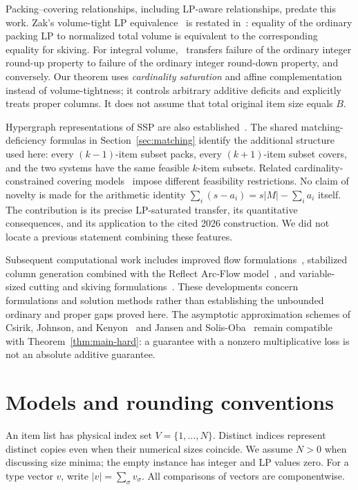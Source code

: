 \documentclass[11pt,a4paper]{article}
\theoremstyle{definition}
\theoremstyle{remark}
\begin{document}
Packing--covering relationships, including LP-aware relationships, predate this work. Zak's volume-tight LP equivalence~\cite[Theorem~2]{Zak03} is restated in~\cite[Lemma~8]{MS19}: equality of the ordinary packing LP to normalized total volume is equivalent to the corresponding equality for skiving. For integral volume,~\cite[Theorem~7]{MS19} transfers failure of the ordinary integer round-up property to failure of the ordinary integer round-down property, and conversely. Our theorem uses \emph{cardinality saturation} and affine complementation instead of volume-tightness; it controls arbitrary additive deficits and explicitly treats proper columns. It does not assume that total original item size equals $B$.

Hypergraph representations of SSP are also established~\cite{MS18c}. The shared matching-deficiency formulas in Section~\ref{sec:matching} identify the additional structure used here: every $(k-1)$-item subset packs, every $(k+1)$-item subset covers, and the two systems have the same feasible $k$-item subsets. Related cardinality-constrained covering models~\cite{EIL13} impose different feasibility restrictions. No claim of novelty is made for the arithmetic identity $\sum_i(s-a_i)=s|M|-\sum_i a_i$ itself. The contribution is its precise LP-saturated transfer, its quantitative consequences, and its application to the cited 2026 construction. We did not locate a previous statement combining these features.

Subsequent computational work includes improved flow formulations~\cite{MDISS20}, stabilized column generation combined with the Reflect Arc-Flow model~\cite{KIMS23}, and variable-sized cutting and skiving formulations~\cite{DM26}. These developments concern formulations and solution methods rather than establishing the unbounded ordinary and proper gaps proved here. The asymptotic approximation schemes of Csirik, Johnson, and Kenyon~\cite{CJK01} and Jansen and Solis-Oba~\cite{JSO03} remain compatible with Theorem~\ref{thm:main-hard}: a guarantee with a nonzero multiplicative loss is not an absolute additive guarantee.

\section{Models and rounding conventions}\label{sec:models}
An item list has physical index set $V=\{1,\ldots,N\}$. Distinct indices represent distinct copies even when their numerical sizes coincide. We assume $N>0$ when discussing size minima; the empty instance has integer and LP values zero. For a type vector $v$, write $|v|=\sum_\sigma v_\sigma$. All comparisons of vectors are componentwise.
\end{document}
